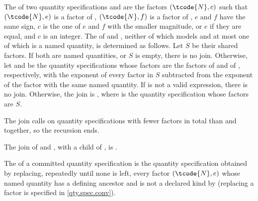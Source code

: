 \pnum
The  of two quantity specifications  and  are
the factors $(\tcode{N}, c)$ such that
$(\tcode{N}, e)$ is a factor of , $(\tcode{N}, f)$ is a factor of ,
$e$ and $f$ have the same sign,
$c$ is the one of $e$ and $f$ with the smaller magnitude, or $e$ if they are equal, and $c$ is an integer.
The  of  and , neither of which models
 and at most one of which is a named quantity,
is determined as follows.
Let $S$ be their shared factors.
If both are named quantities, or $S$ is empty, there is no join.
Otherwise, let  and  be the quantity specifications whose factors are
the factors of  and of , respectively,
with the exponent of every factor in $S$ subtracted from the exponent of the factor with the same named quantity.
If  is not a valid expression, there is no join.
Otherwise, the join is ,
where  is the quantity specification whose factors are $S$.
\begin{note}
The join calls  on quantity specifications with fewer factors in total than  and  together, so the recursion ends.
\end{note}
\begin{example}
The join of  and ,
with  a child of ,
is .
\end{example}

\pnum
The  of a committed quantity specification is
the quantity specification obtained by replacing, repeatedly until none is left,
every factor $(\tcode{N}, e)$ whose named quantity has a defining ancestor 
and is not a declared kind by 
(replacing a factor is specified in \ref{qty.spec.conv}).

